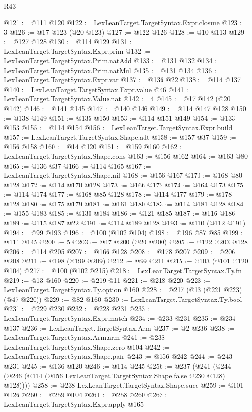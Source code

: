 \begin{lexlean}{R43}
\begin{coremodule}
@121 := @111 @120
@122 := LexLeanTarget.TargetSyntax.Expr.closure
@123 := 3
@126 := @17 @123 (@20 @123)
@127 := @122 @126
@128 := @10 @113
@129 := @127 @128
@130 := @114 @129
@131 := LexLeanTarget.TargetSyntax.Expr.prim
@132 := LexLeanTarget.TargetSyntax.Prim.natAdd
@133 := @131 @132
@134 := LexLeanTarget.TargetSyntax.Prim.natMul
@135 := @131 @134
@136 := LexLeanTarget.TargetSyntax.Expr.var
@137 := @136 @22
@138 := @114 @137
@140 := LexLeanTarget.TargetSyntax.Expr.value @46
@141 := LexLeanTarget.TargetSyntax.Value.nat
@142 := 4
@145 := @17 @142 (@20 @142)
@146 := @141 @145
@147 := @140 @146
@149 := @114 @147 @128
@150 := @138 @149
@151 := @135 @150
@153 := @114 @151 @149
@154 := @133 @153
@155 := @114 @154
@156 := LexLeanTarget.TargetSyntax.Expr.build
@157 := LexLeanTarget.TargetSyntax.Shape.adt
@158 := @157 @37
@159 := @156 @158
@160 := @14 @120
@161 := @159 @160
@162 := LexLeanTarget.TargetSyntax.Shape.cons
@163 := @156 @162
@164 := @163 @80
@165 := @136 @37
@166 := @114 @165
@167 := LexLeanTarget.TargetSyntax.Shape.nil
@168 := @156 @167
@170 := @168 @80 @128
@172 := @114 @170 @128
@173 := @166 @172
@174 := @164 @173
@175 := @114 @174
@177 := @168 @85 @128
@178 := @114 @177
@179 := @178 @128
@180 := @175 @179
@181 := @161 @180
@183 := @114 @181 @128
@184 := @155 @183
@185 := @130 @184
@186 := @121 @185
@187 := @116 @186
@189 := @115 @187 @22
@191 := @114 @189 @128
@193 := @110 (@112 @191)
@194 := @99 @193
@196 := @100 (@102 @104)
@198 := @196 @87 @85
@199 := @111 @145
@200 := 5
@203 := @17 @200 (@20 @200)
@205 := @122 @203 @128
@206 := @114 @205
@207 := @166 @128
@208 := @178 @207
@209 := @206 @208
@211 := @198 (@199 @209)
@212 := @99 @211
@215 := @103 (@101 @120 @104)
@217 := @100 (@102 @215)
@218 := LexLeanTarget.TargetSyntax.Ty.fn
@219 := @13 @160
@220 := @219 @11
@221 := @218 @220
@223 := LexLeanTarget.TargetSyntax.Ty.option @160
@228 := @217 (@13 (@221 @223) (@47 @220))
@229 := @82 @160
@230 := LexLeanTarget.TargetSyntax.Ty.bool
@231 := @229 @230
@232 := @228 @231
@233 := LexLeanTarget.TargetSyntax.Expr.match
@234 := @233 @231
@235 := @234 @137
@236 := LexLeanTarget.TargetSyntax.Arm
@237 := @2 @236
@238 := LexLeanTarget.TargetSyntax.Arm.arm
@241 := @238 LexLeanTarget.TargetSyntax.Shape.zero @104
@242 := LexLeanTarget.TargetSyntax.Shape.pair
@243 := @156 @242
@244 := @243 @231
@245 := @136 @120
@246 := @114 @245
@256 := @237
    (@241 (@244 (@246 (@114 (@156 LexLeanTarget.TargetSyntax.Shape.false @230 @128) @128))))
@258 := @238 LexLeanTarget.TargetSyntax.Shape.succ
@259 := @101 @126
@260 := @259 @104
@261 := @258 @260
@263 := LexLeanTarget.TargetSyntax.Expr.apply @165

\end{coremodule}
\end{lexlean}
